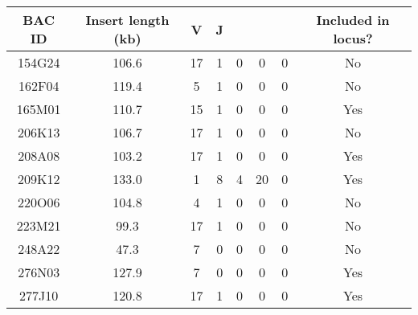 \begin{tabular}{cccccccc}\toprule
\textbf{BAC ID} & \textbf{Insert length (kb)} & \textbf{V} & \textbf{J} & \textbf{\cm{}} & \textbf{\cd{}} & \textbf{\cz{}} & Included in locus?\\\midrule
154G24 & 106.6 & 17 & 1 & 0 & 0  & 0 & No\\
162F04 & 119.4 & 5  & 1 & 0 & 0  & 0 & No\\
165M01 & 110.7 & 15 & 1 & 0 & 0  & 0 & Yes\\
206K13 & 106.7 & 17 & 1 & 0 & 0  & 0 & No\\
208A08 & 103.2 & 17 & 1 & 0 & 0  & 0 & Yes\\
209K12 & 133.0 & 1  & 8 & 4 & 20 & 0 & Yes\\
220O06 & 104.8 & 4  & 1 & 0 & 0  & 0 & No\\
223M21 & 99.3  & 17 & 1 & 0 & 0  & 0 & No\\
248A22 & 47.3  & 7  & 0 & 0 & 0  & 0 & No\\
276N03 & 127.9 & 7  & 0 & 0 & 0  & 0 & Yes\\
277J10 & 120.8 & 17 & 1 & 0 & 0  & 0 & Yes\\
\bottomrule\end{tabular}
